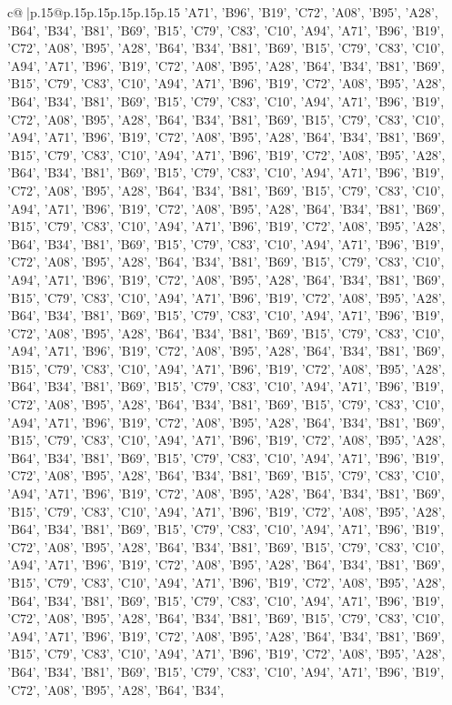 \documentclass{article}
\begin{document}
{\begin{supertabular}{c@{$\;$}|p{.15\linewidth}@{}p{.15\linewidth}p{.15\linewidth}p{.15\linewidth}p{.15\linewidth}p{.15\linewidth}}
{{{'A71', 'B96', 'B19', 'C72', 'A08', 'B95', 'A28', 'B64', 'B34', 'B81', 'B69', 'B15', 'C79', 'C83', 'C10', 'A94', 'A71', 'B96', 'B19', 'C72', 'A08', 'B95', 'A28', 'B64', 'B34', 'B81', 'B69', 'B15', 'C79', 'C83', 'C10', 'A94', 'A71', 'B96', 'B19', 'C72', 'A08', 'B95', 'A28', 'B64', 'B34', 'B81', 'B69', 'B15', 'C79', 'C83', 'C10', 'A94', 'A71', 'B96', 'B19', 'C72', 'A08', 'B95', 'A28', 'B64', 'B34', 'B81', 'B69', 'B15', 'C79', 'C83', 'C10', 'A94', 'A71', 'B96', 'B19', 'C72', 'A08', 'B95', 'A28', 'B64', 'B34', 'B81', 'B69', 'B15', 'C79', 'C83', 'C10', 'A94', 'A71', 'B96', 'B19', 'C72', 'A08', 'B95', 'A28', 'B64', 'B34', 'B81', 'B69', 'B15', 'C79', 'C83', 'C10', 'A94', 'A71', 'B96', 'B19', 'C72', 'A08', 'B95', 'A28', 'B64', 'B34', 'B81', 'B69', 'B15', 'C79', 'C83', 'C10', 'A94', 'A71', 'B96', 'B19', 'C72', 'A08', 'B95', 'A28', 'B64', 'B34', 'B81', 'B69', 'B15', 'C79', 'C83', 'C10', 'A94', 'A71', 'B96', 'B19', 'C72', 'A08', 'B95', 'A28', 'B64', 'B34', 'B81', 'B69', 'B15', 'C79', 'C83', 'C10', 'A94', 'A71', 'B96', 'B19', 'C72', 'A08', 'B95', 'A28', 'B64', 'B34', 'B81', 'B69', 'B15', 'C79', 'C83', 'C10', 'A94', 'A71', 'B96', 'B19', 'C72', 'A08', 'B95', 'A28', 'B64', 'B34', 'B81', 'B69', 'B15', 'C79', 'C83', 'C10', 'A94', 'A71', 'B96', 'B19', 'C72', 'A08', 'B95', 'A28', 'B64', 'B34', 'B81', 'B69', 'B15', 'C79', 'C83', 'C10', 'A94', 'A71', 'B96', 'B19', 'C72', 'A08', 'B95', 'A28', 'B64', 'B34', 'B81', 'B69', 'B15', 'C79', 'C83', 'C10', 'A94', 'A71', 'B96', 'B19', 'C72', 'A08', 'B95', 'A28', 'B64', 'B34', 'B81', 'B69', 'B15', 'C79', 'C83', 'C10', 'A94', 'A71', 'B96', 'B19', 'C72', 'A08', 'B95', 'A28', 'B64', 'B34', 'B81', 'B69', 'B15', 'C79', 'C83', 'C10', 'A94', 'A71', 'B96', 'B19', 'C72', 'A08', 'B95', 'A28', 'B64', 'B34', 'B81', 'B69', 'B15', 'C79', 'C83', 'C10', 'A94', 'A71', 'B96', 'B19', 'C72', 'A08', 'B95', 'A28', 'B64', 'B34', 'B81', 'B69', 'B15', 'C79', 'C83', 'C10', 'A94', 'A71', 'B96', 'B19', 'C72', 'A08', 'B95', 'A28', 'B64', 'B34', 'B81', 'B69', 'B15', 'C79', 'C83', 'C10', 'A94', 'A71', 'B96', 'B19', 'C72', 'A08', 'B95', 'A28', 'B64', 'B34', 'B81', 'B69', 'B15', 'C79', 'C83', 'C10', 'A94', 'A71', 'B96', 'B19', 'C72', 'A08', 'B95', 'A28', 'B64', 'B34', 'B81', 'B69', 'B15', 'C79', 'C83', 'C10', 'A94', 'A71', 'B96', 'B19', 'C72', 'A08', 'B95', 'A28', 'B64', 'B34', 'B81', 'B69', 'B15', 'C79', 'C83', 'C10', 'A94', 'A71', 'B96', 'B19', 'C72', 'A08', 'B95', 'A28', 'B64', 'B34', 'B81', 'B69', 'B15', 'C79', 'C83', 'C10', 'A94', 'A71', 'B96', 'B19', 'C72', 'A08', 'B95', 'A28', 'B64', 'B34', 'B81', 'B69', 'B15', 'C79', 'C83', 'C10', 'A94', 'A71', 'B96', 'B19', 'C72', 'A08', 'B95', 'A28', 'B64', 'B34', 'B81', 'B69', 'B15', 'C79', 'C83', 'C10', 'A94', 'A71', 'B96', 'B19', 'C72', 'A08', 'B95', 'A28', 'B64', 'B34', 'B81', 'B69', 'B15', 'C79', 'C83', 'C10', 'A94', 'A71', 'B96', 'B19', 'C72', 'A08', 'B95', 'A28', 'B64', 'B34', 'B81', 'B69', 'B15', 'C79', 'C83', 'C10', 'A94', 'A71', 'B96', 'B19', 'C72', 'A08', 'B95', 'A28', 'B64', 'B34', 'B81', 'B69', 'B15', 'C79', 'C83', 'C10', 'A94', 'A71', 'B96', 'B19', 'C72', 'A08', 'B95', 'A28', 'B64', 'B34', 'B81', 'B69', 'B15', 'C79', 'C83', 'C10', 'A94', 'A71', 'B96', 'B19', 'C72', 'A08', 'B95', 'A28', 'B64', 'B34', }}}
\end{supertabular}}
\end{document}

